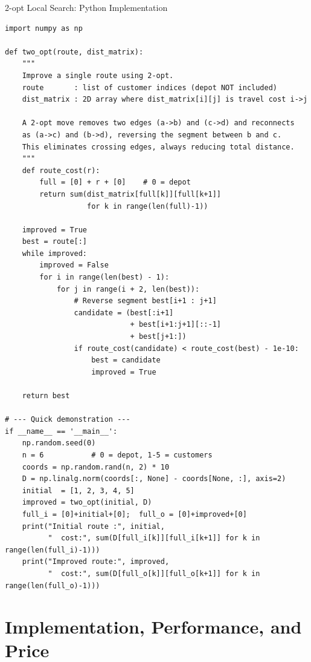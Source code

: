 \documentclass[aspectratio=169,10pt]{beamer}
\begin{document}
\begin{frame}[fragile]{2-opt Local Search: Python Implementation}
  \begin{lstlisting}[caption={2-opt improvement for a single VRP route}]
import numpy as np

def two_opt(route, dist_matrix):
    """
    Improve a single route using 2-opt.
    route       : list of customer indices (depot NOT included)
    dist_matrix : 2D array where dist_matrix[i][j] is travel cost i->j

    A 2-opt move removes two edges (a->b) and (c->d) and reconnects
    as (a->c) and (b->d), reversing the segment between b and c.
    This eliminates crossing edges, always reducing total distance.
    """
    def route_cost(r):
        full = [0] + r + [0]    # 0 = depot
        return sum(dist_matrix[full[k]][full[k+1]]
                   for k in range(len(full)-1))

    improved = True
    best = route[:]
    while improved:
        improved = False
        for i in range(len(best) - 1):
            for j in range(i + 2, len(best)):
                # Reverse segment best[i+1 : j+1]
                candidate = (best[:i+1]
                             + best[i+1:j+1][::-1]
                             + best[j+1:])
                if route_cost(candidate) < route_cost(best) - 1e-10:
                    best = candidate
                    improved = True

    return best

# --- Quick demonstration ---
if __name__ == '__main__':
    np.random.seed(0)
    n = 6           # 0 = depot, 1-5 = customers
    coords = np.random.rand(n, 2) * 10
    D = np.linalg.norm(coords[:, None] - coords[None, :], axis=2)
    initial  = [1, 2, 3, 4, 5]
    improved = two_opt(initial, D)
    full_i = [0]+initial+[0];  full_o = [0]+improved+[0]
    print("Initial route :", initial,
          "  cost:", sum(D[full_i[k]][full_i[k+1]] for k in range(len(full_i)-1)))
    print("Improved route:", improved,
          "  cost:", sum(D[full_o[k]][full_o[k+1]] for k in range(len(full_o)-1)))
  \end{lstlisting}
\end{frame}

\section{Implementation, Performance, and Price}
\end{document}
